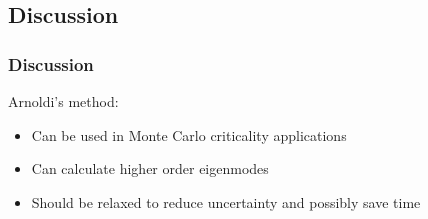 \documentclass[color={usenames, dvipsnames},ignorenonframetext]{beamer}
\begin{document}
\begin{frame}
\end{frame}


\subsection{Discussion}
\begin{frame}
    \frametitle{Discussion}
    Arnoldi's method:
    \begin{itemize}
        \item Can be used in Monte Carlo criticality applications
        \item Can calculate higher order eigenmodes
        \item Should be relaxed to reduce uncertainty and possibly save time
    \end{itemize}
\end{frame}
\end{document}
